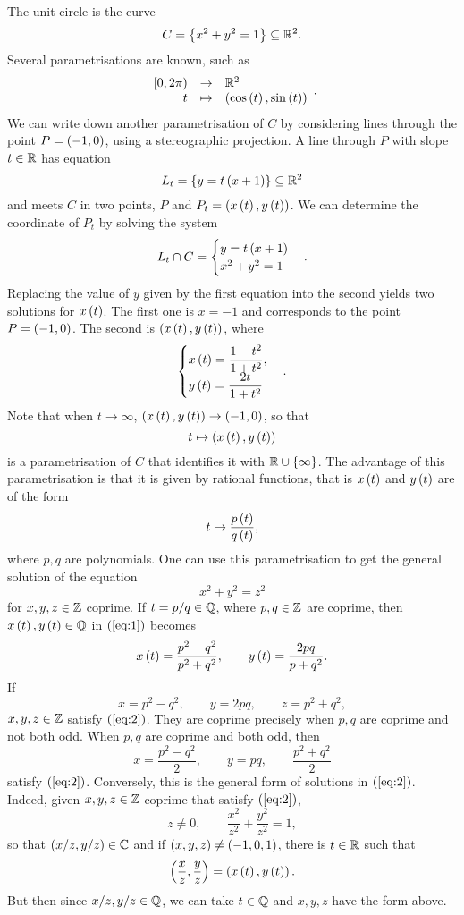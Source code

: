 \begin{example}
The unit circle is the curve
$$ C = \left\{ x^2 + y^2 = 1 \right\} \subseteq \mathbb{R}^2. $$
Several parametrisations are known, such as
$$ \function{[0, 2\pi)}{\R^2}{t}{\rb{\cos\rb{t}, \sin\rb{t}}}. $$
We can write down another parametrisation of $ C $ by considering lines through the point $ P = \left( -1, 0 \right) $, using a stereographic projection. A line through $ P $ with slope $ t \in \mathbb{R} $ has equation
$$ L_t = \left\{ y = t\left( x + 1 \right) \right\} \subseteq \mathbb{R}^2 $$
and meets $ C $ in two points, $ P $ and $ P_t = \left( x\left( t \right), y\left( t \right) \right) $. We can determine the coordinate of $ P_t $ by solving the system
$$ L_t \cap C =
\begin{cases}
y = t\left( x + 1 \right) \\
x^2 + y^2 = 1
\end{cases}.
$$
Replacing the value of $ y $ given by the first equation into the second yields two solutions for $ x\left( t \right) $. The first one is $ x = -1 $ and corresponds to the point $ P = \left( -1, 0 \right) $. The second is $ \left( x\left( t \right), y\left( t \right) \right) $, where
\begin{equation}
\label{eq:1}
\begin{cases}
x\left( t \right) = \dfrac{1 - t^2}{1 + t^2}, \\
y\left( t \right) = \dfrac{2t}{1 + t^2}
\end{cases}.
\end{equation}
Note that when $ t \to \infty $, $ \left( x\left( t \right), y\left( t \right) \right) \to \left( -1, 0 \right) $, so that
$$ t \mapsto \left( x\left( t \right), y\left( t \right) \right) $$
is a parametrisation of $ C $ that identifies it with $ \mathbb{R} \cup \left\{ \infty \right\} $. The advantage of this parametrisation is that it is given by rational functions, that is $ x\left( t \right) $ and $ y\left( t \right) $ are of the form
$$ t \mapsto \dfrac{p\left( t \right)}{q\left( t \right)}, $$
where $ p, q $ are polynomials. One can use this parametrisation to get the general solution of the equation
\begin{equation}
\label{eq:2}
x^2 + y^2 = z^2
\end{equation}
for $ x, y, z \in \mathbb{Z} $ coprime. If $ t = p / q \in \mathbb{Q} $, where $ p, q \in \mathbb{Z} $ are coprime, then $ x\left( t \right), y\left( t \right) \in \mathbb{Q} $ in $ \left( \ref{eq:1} \right) $ becomes
$$ x\left( t \right) = \dfrac{p^2 - q^2}{p^2 + q^2}, \qquad y\left( t \right) = \dfrac{2pq}{p + q^2}. $$
If
$$ x = p^2 - q^2, \qquad y = 2pq, \qquad z = p^2 + q^2, $$
$ x, y, z \in \mathbb{Z} $ satisfy $ \left( \ref{eq:2} \right) $. They are coprime precisely when $ p, q $ are coprime and not both odd. When $ p, q $ are coprime and both odd, then
$$ x = \dfrac{p^2 - q^2}{2}, \qquad y = pq, \qquad \dfrac{p^2 + q^2}{2} $$
satisfy $ \left( \ref{eq:2} \right) $. Conversely, this is the general form of solutions in $ \left( \ref{eq:2} \right) $. Indeed, given $ x, y, z \in \mathbb{Z} $ coprime that satisfy $ \left( \ref{eq:2} \right) $,
$$ z \ne 0, \qquad \dfrac{x^2}{z^2} + \dfrac{y^2}{z^2} = 1, $$
so that $ \left( x / z, y / z \right) \in \mathbb{C} $ and if $ \left( x, y, z \right) \ne \left( -1, 0, 1 \right) $, there is $ t \in \mathbb{R} $ such that
$$ \left( \dfrac{x}{z}, \dfrac{y}{z} \right) = \left( x\left( t \right), y\left( t \right) \right). $$
But then since $ x / z, y / z \in \mathbb{Q} $, we can take $ t \in \mathbb{Q} $ and $ x, y, z $ have the form above.
\end{example}

